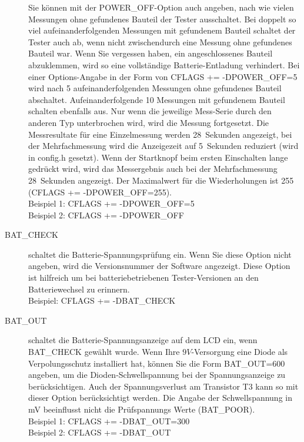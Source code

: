 \begin{description}
Sie können mit der POWER\_OFF-Option auch angeben, nach wie vielen Messungen ohne gefundenes Bauteil der Tester ausschaltet.
Bei doppelt so viel aufeinanderfolgenden Messungen mit gefundenem Bauteil schaltet der Tester auch ab,
wenn nicht zwischendurch eine Messung ohne gefundenes Bauteil war.
Wenn Sie vergessen haben, ein angeschlossenes Bauteil abzuklemmen, wird so eine vollständige Batterie-Entladung
verhindert.
Bei einer Options-Angabe in der Form von CFLAGS += -DPOWER\_OFF=5 wird nach 5 aufeinanderfolgenden Messungen ohne
gefundenes Bauteil abschaltet. Aufeinanderfolgende 10 Messungen mit gefundenem Bauteil schalten ebenfalls aus.
Nur wenn die jeweilige Mess-Serie durch den anderen Typ unterbrochen wird, wird die Messung fortgesetzt.
Die Messresultate für eine Einzelmessung werden 28~Sekunden angezeigt, bei der Mehrfachmessung wird die
Anzeigezeit auf 5~Sekunden reduziert (wird in config.h gesetzt).
Wenn der Startknopf beim ersten Einschalten lange gedrückt wird, wird das Messergebnis
 auch bei der Mehrfachmessung 28~Sekunden angezeigt.
Der Maximalwert für die Wiederholungen ist 255 (CFLAGS += -DPOWER\_OFF=255).\\
Beispiel 1: CFLAGS += -DPOWER\_OFF=5 \\
Beispiel 2: CFLAGS += -DPOWER\_OFF 

  \item[BAT\_CHECK] schaltet die Batterie-Spannungsprüfung ein.
 Wenn Sie diese Option nicht angeben, wird die Versionsnummer der Software angezeigt.
Diese Option ist hilfreich um bei batteriebetriebenen Tester-Versionen an den Batteriewechsel zu erinnern.\\
Beispiel: CFLAGS += -DBAT\_CHECK

  \item[BAT\_OUT] schaltet die Batterie-Spannungsanzeige auf dem LCD ein, wenn BAT\_CHECK gewählt wurde.
 Wenn Ihre \(9V\)-Versorgung eine Diode als Verpolungsschutz installiert hat, können Sie 
die Form BAT\_OUT=600 angeben, um die Dioden-Schwellspannung 
bei der Spannungsanzeige zu berücksichtigen.
Auch der Spannungsverlust am Transistor T3 kann so mit dieser Option berücksichtigt werden.
Die Angabe der Schwellspannung in mV beeinflusst nicht die Prüf\-span\-nungs Werte (BAT\_POOR).\\
Beispiel 1: CFLAGS += -DBAT\_OUT=300 \\
Beispiel 2: CFLAGS += -DBAT\_OUT


\end{description}
